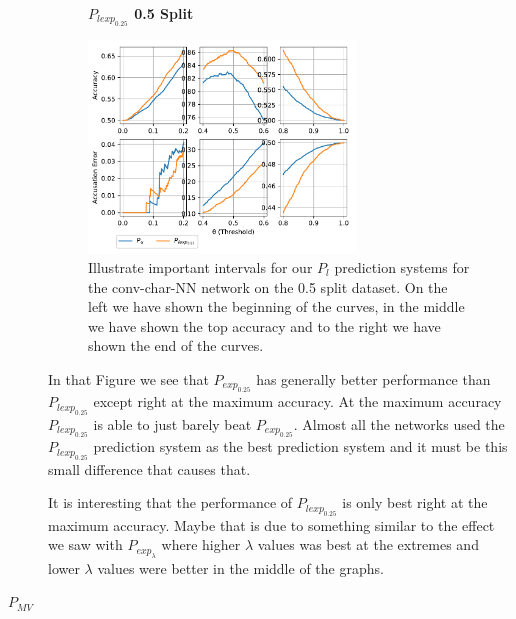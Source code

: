 \begin{description}
        \begin{figure}
            \centering
            \textbf{$P_{lexp_{0.25}}$ 0.5 Split}\par\medskip
            \includegraphics[width=0.7\textwidth]{./pictures/discussion/conv_char_nn_prediction_zoom_50_text_length_and_time}
            \caption{Illustrate important intervals for our $P_l$ prediction
                systems for the \gls{conv-char-NN} network on the 0.5 split
                dataset. On the left we have shown the beginning of the curves,
                in the middle we have shown the top accuracy and to the right we
                have shown the end of the curves.}
            \label{fig:conv_char_prediction_zoom_50_text_length_and_time}
        \end{figure}

        In that Figure we see that $P_{exp_{0.25}}$ has generally better
        performance than $P_{lexp_{0.25}}$ except right at the maximum accuracy.
        At the maximum accuracy $P_{lexp_{0.25}}$ is able to just barely beat
        $P_{exp_{0.25}}$. Almost all the networks used the $P_{lexp_{0.25}}$
        prediction system as the best prediction system and it must be this
        small difference that causes that.

        It is interesting that the performance of $P_{lexp_{0.25}}$ is only best
        right at the maximum accuracy. Maybe that is due to something similar to
        the effect we saw with $P_{exp_{\lambda}}$ where higher $\lambda$ values
        was best at the extremes and lower $\lambda$ values were better in the
        middle of the graphs.

    \item[$P_{MV}$]


\end{description}
